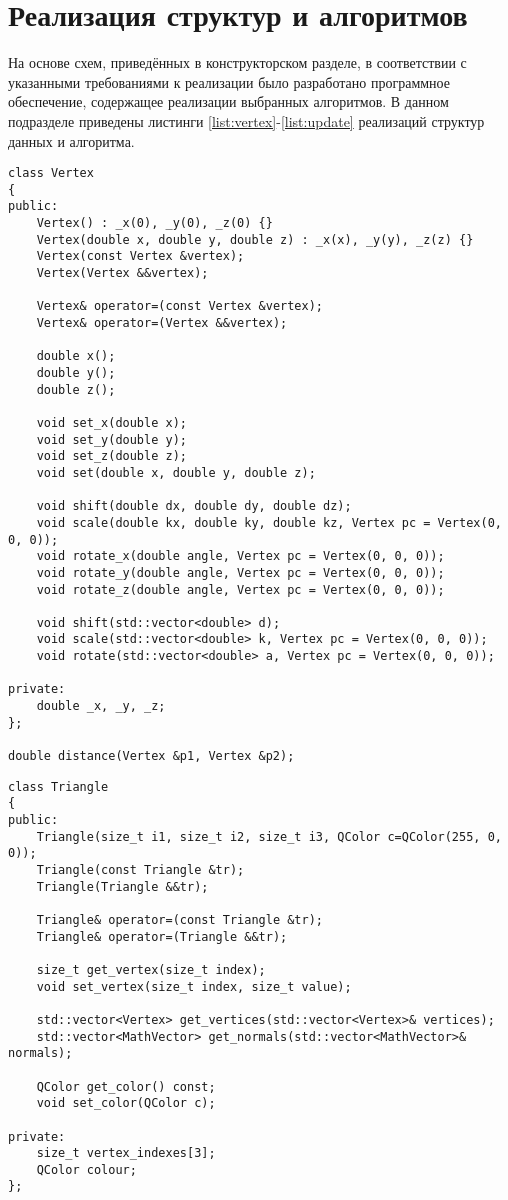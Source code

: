 \section{Реализация структур и алгоритмов}
\hspace{0.6cm}На основе схем, приведённых в конструкторском разделе, в соответствии с указанными требованиями к реализации было разработано программное обеспечение, содержащее реализации выбранных алгоритмов. В данном подразделе приведены листинги \ref{list:vertex}-\ref{list:update} реализаций структур данных и алгоритма.

\begin{lstlisting}[caption=Класс <<вершина>> Vertex, label=list:vertex]
class Vertex
{
public:
	Vertex() : _x(0), _y(0), _z(0) {}
	Vertex(double x, double y, double z) : _x(x), _y(y), _z(z) {}
	Vertex(const Vertex &vertex);
	Vertex(Vertex &&vertex);
	
	Vertex& operator=(const Vertex &vertex);
	Vertex& operator=(Vertex &&vertex);
	
	double x();
	double y();
	double z();
	
	void set_x(double x);
	void set_y(double y);
	void set_z(double z);
	void set(double x, double y, double z);
	
	void shift(double dx, double dy, double dz);
	void scale(double kx, double ky, double kz, Vertex pc = Vertex(0, 0, 0));
	void rotate_x(double angle, Vertex pc = Vertex(0, 0, 0));
	void rotate_y(double angle, Vertex pc = Vertex(0, 0, 0));
	void rotate_z(double angle, Vertex pc = Vertex(0, 0, 0));
	
	void shift(std::vector<double> d);
	void scale(std::vector<double> k, Vertex pc = Vertex(0, 0, 0));
	void rotate(std::vector<double> a, Vertex pc = Vertex(0, 0, 0));

private:
	double _x, _y, _z;
};

double distance(Vertex &p1, Vertex &p2);
\end{lstlisting}

\begin{lstlisting}[caption=Класс <<грань>> Trinangle, label=list:triangle]
class Triangle
{
public:
	Triangle(size_t i1, size_t i2, size_t i3, QColor c=QColor(255, 0, 0));
	Triangle(const Triangle &tr);
	Triangle(Triangle &&tr);
	
	Triangle& operator=(const Triangle &tr);
	Triangle& operator=(Triangle &&tr);
	
	size_t get_vertex(size_t index);
	void set_vertex(size_t index, size_t value);
	
	std::vector<Vertex> get_vertices(std::vector<Vertex>& vertices);
	std::vector<MathVector> get_normals(std::vector<MathVector>& normals);
	
	QColor get_color() const;
	void set_color(QColor c);

private:
	size_t vertex_indexes[3];
	QColor colour;
};
\end{lstlisting}

